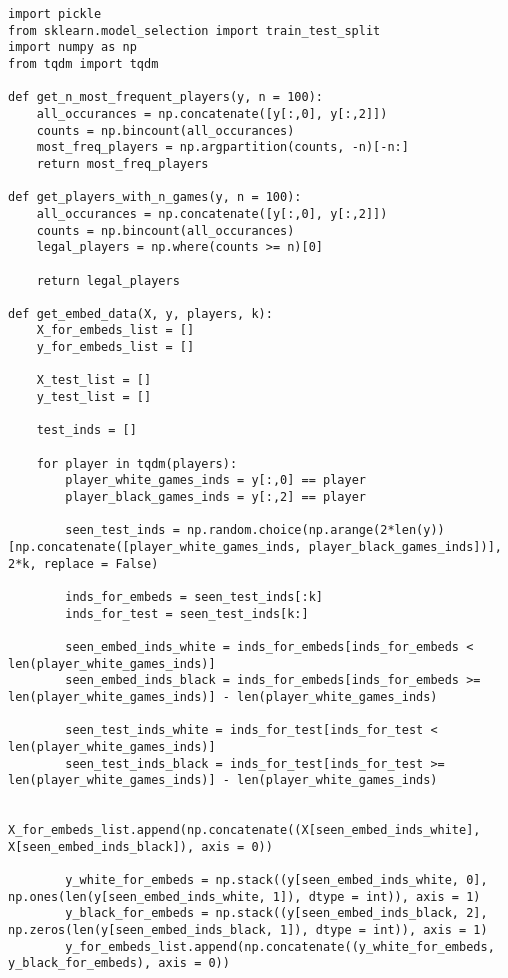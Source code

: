 \begin{verbatim}
import pickle
from sklearn.model_selection import train_test_split
import numpy as np
from tqdm import tqdm

def get_n_most_frequent_players(y, n = 100):
    all_occurances = np.concatenate([y[:,0], y[:,2]])
    counts = np.bincount(all_occurances)
    most_freq_players = np.argpartition(counts, -n)[-n:]
    return most_freq_players

def get_players_with_n_games(y, n = 100):
    all_occurances = np.concatenate([y[:,0], y[:,2]])
    counts = np.bincount(all_occurances)
    legal_players = np.where(counts >= n)[0]

    return legal_players

def get_embed_data(X, y, players, k):
    X_for_embeds_list = []
    y_for_embeds_list = []

    X_test_list = []
    y_test_list = []

    test_inds = []

    for player in tqdm(players):
        player_white_games_inds = y[:,0] == player
        player_black_games_inds = y[:,2] == player

        seen_test_inds = np.random.choice(np.arange(2*len(y))[np.concatenate([player_white_games_inds, player_black_games_inds])], 2*k, replace = False)

        inds_for_embeds = seen_test_inds[:k]
        inds_for_test = seen_test_inds[k:]

        seen_embed_inds_white = inds_for_embeds[inds_for_embeds < len(player_white_games_inds)]
        seen_embed_inds_black = inds_for_embeds[inds_for_embeds >= len(player_white_games_inds)] - len(player_white_games_inds)

        seen_test_inds_white = inds_for_test[inds_for_test < len(player_white_games_inds)]
        seen_test_inds_black = inds_for_test[inds_for_test >= len(player_white_games_inds)] - len(player_white_games_inds)

        X_for_embeds_list.append(np.concatenate((X[seen_embed_inds_white], X[seen_embed_inds_black]), axis = 0))
        
        y_white_for_embeds = np.stack((y[seen_embed_inds_white, 0], np.ones(len(y[seen_embed_inds_white, 1]), dtype = int)), axis = 1)
        y_black_for_embeds = np.stack((y[seen_embed_inds_black, 2], np.zeros(len(y[seen_embed_inds_black, 1]), dtype = int)), axis = 1)
        y_for_embeds_list.append(np.concatenate((y_white_for_embeds, y_black_for_embeds), axis = 0))


\end{verbatim}
